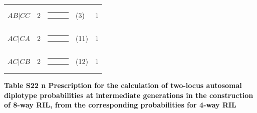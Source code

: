 \documentclass[9pt,letterpaper,twoside]{article}
\begin{document}
{\begin{center}
\begin{tabular}{ccrlc}
$AB|CC$ & 2 & 
{\renewcommand{\arraystretch}{0.3}
\renewcommand{\tabcolsep}{0.5mm}
\parbox[b][3mm][c]{12mm}{
\begin{tabular}{|p{2mm}|p{2mm}||p{2mm}|} \hline
$\bullet$ &           & $\circ  $ \\
          & $\bullet$ & $\circ  $ \\ \hline
\end{tabular}}}
& (3) & $1$ \\
$AC|CA$ & 2 & 
{\renewcommand{\arraystretch}{0.3}
\renewcommand{\tabcolsep}{0.5mm}
\parbox[b][3mm][c]{12mm}{
\begin{tabular}{|p{2mm}|p{2mm}||p{2mm}|} \hline
$\bullet$ &           & $\circ  $ \\
$\circ  $ &           & $\bullet$ \\ \hline
\end{tabular}}}
& (11) & $1$ \\
$AC|CB$ & 2 & 
{\renewcommand{\arraystretch}{0.3}
\renewcommand{\tabcolsep}{0.5mm}
\parbox[b][3mm][c]{12mm}{
\begin{tabular}{|p{2mm}|p{2mm}||p{2mm}|} \hline
$\bullet$ &           & $\circ  $ \\
          & $\circ  $ & $\bullet$ \\ \hline
\end{tabular}}}
& (12) & $1$ \\
\hline
\end{tabular}
\end{center}
}

\newpage

\noindent \textbf{Table S22 {\color{white} n} Prescription for the calculation of two-locus
autosomal diplotype probabilities at intermediate generations in the
construction of 8-way RIL, from the corresponding probabilities for
4-way RIL}

\bigskip
\end{document}
